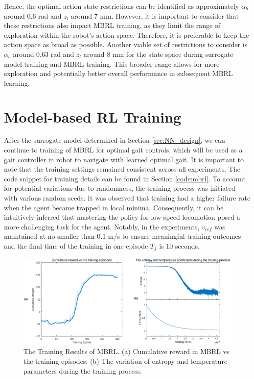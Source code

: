 Hence, the optimal action state restrictions can be identified as approximately $\alpha_b$ around 0.6 rad and $z_l$ around 7 mm. However, it is important to consider that these restrictions also impact MBRL training, as they limit the range of exploration within the robot's action space. Therefore, it is preferable to keep the action space as broad as possible. Another viable set of restrictions to consider is $\alpha_b$ around 0.63 rad and $z_l$ around 8 mm for the state space during surrogate model training and MBRL training. This broader range allows for more exploration and potentially better overall performance in subsequent MBRL learning.

\section{Model-based RL Training}
After the surrogate model determined in Section \ref{sec:NN_design}, we can continue to training of MBRL for optimal gait controls, which will be used as a gait controller in robot to navigate with learned optimal gait. It is important to note that the training settings remained consistent across all experiments. The code snippet for training details can be found in Section \ref{code:mbrl}. To account for potential variations due to randomness, the training process was initiated with various random seeds. It was observed that training had a higher failure rate when the agent became trapped in local minima. Consequently, it can be intuitively inferred that mastering the policy for low-speed locomotion posed a more challenging task for the agent. Notably, in the experiments, $v_{ref}$ was maintained at no smaller than 0.1 m/s to ensure meaningful training outcomes and the final time of the training in one episode $T_f$ is 10 seconds.
\begin{figure}[htb]
    \centering
    \includegraphics[width=\linewidth]{img/chap5/MBRL_tr.eps}
    \caption{The Training Results of MBRL. (a) Cumulative reward in MBRL vs the training episodes; (b) The variation of entropy and temperature parameters during the training process.}
    \label{fig:MBRL_tr}
\end{figure}

